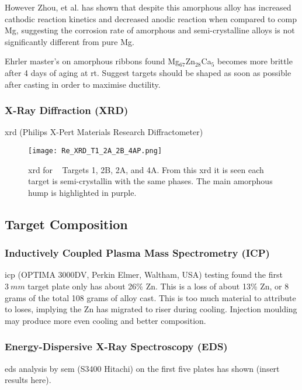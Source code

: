 \documentclass[a4paper,12pt,oneside]{report}%
\begin{document}
However Zhou, et al. \cite{Zhou2013} has shown that despite this amorphous alloy has increased cathodic reaction kinetics and decreased anodic reaction when compared to \acrshort{comp} Mg, suggesting the corrosion rate of amorphous and semi-crystalline alloys is not significantly different from pure Mg. 

Ehrler \cite{Ehrler2008} master's on amorphous ribbons found Mg$_{67}$Zn$_{28}$Ca$_{5}$ becomes more brittle after 4 days of aging at \gls{rt}. Suggest targets should be shaped as soon as possible after casting in order to maximise ductility. 

\subsubsection{X-Ray Diffraction (XRD)}
\gls{xrd} (Philips X-Pert Materials Research Diffractometer)

\begin{figure}[htbp]
	\centering
	\texttt{[image: Re\_XRD\_T1\_2A\_2B\_4AP.png]}
	\caption{\acrshort{xrd} for \MgZnCa~ Targets 1, 2B, 2A, and 4A. From this \acrshort{xrd} it is seen each target is semi-crystallin with the same phases. The main amorphous hump is highlighted in purple.}
	\label{fig:XRD_T1_2_4}
\end{figure}

\subsection{Target Composition}

\subsubsection{Inductively Coupled Plasma Mass Spectrometry (ICP)}
\Gls{icp} (OPTIMA 3000DV, Perkin Elmer, Waltham, USA) testing found the first $3~ mm$ target plate only has about 26\% Zn. This is a loss of about 13\% Zn, or 8 grams of the total 108 grams of alloy cast.  This is too much material to attribute to loses, implying the Zn has migrated to riser during cooling. Injection moulding may produce more even cooling and better composition. 

\subsubsection{Energy-Dispersive X-Ray Spectroscopy (EDS)}
\Gls{eds} analysis by \gls{sem} (S3400 Hitachi) on the first five plates has shown (insert results here). 
\end{document}
